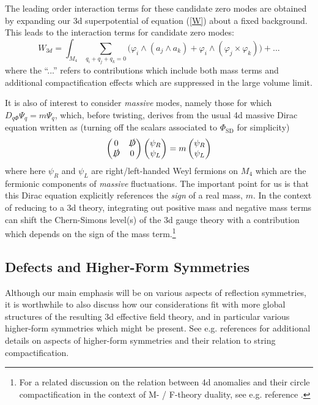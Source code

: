 \documentclass[12pt]{article}%
\numberwithin{equation}{section}
\renewcommand{\(}{\left(}
\renewcommand{\)}{\right)}
\renewcommand{\[}{\left[}
\renewcommand{\]}{\right]}
\begin{document}
The leading order interaction terms for these candidate zero modes are obtained by expanding our 3d superpotential
of equation (\ref{W}) about a fixed background. This leads to the interaction terms for candidate zero modes:
\begin{equation}
W_{3d}= \int_{M_4} \sum_{q_i+q_j+q_k=0}\big(\varphi_{i}\wedge (a_{j}\wedge a_{k})  + \varphi_{i}\wedge (\varphi_{j}\times \varphi_{k})\big) + ...
\end{equation}
where the ``...'' refers to contributions which include both mass terms and additional compactification effects which are suppressed
in the large volume limit.

It is also of interest to consider \textit{massive} modes, namely those for which $D_{q \Phi} \Psi_q = m \Psi_q$, which, before twisting, derives from the usual 4d massive Dirac equation written as (turning off the scalars associated to $\Phi_{\mathrm{SD}}$ for simplicity)
\begin{equation}
\begin{pmatrix}
0 & \slashed{D} \\
\slashed{D} & 0
\end{pmatrix}
\begin{pmatrix}
\psi_R \\
\psi_L
\end{pmatrix}=
m\begin{pmatrix}
\psi_R \\
\psi_L
\end{pmatrix}
\end{equation}
where here $\psi_R$ and $\psi_L$ are right/left-handed Weyl fermions
on $M_4$ which are the fermionic components of \textit{massive} fluctuations.
The important point for us is that this Dirac equation
explicitly references the \textit{sign} of a real mass, $m$.
In the context of reducing to a 3d theory, integrating out positive
mass and negative mass terms can shift the Chern-Simons level(s) of
the 3d gauge theory with a contribution which depends on
the sign of the mass term.\footnote{For a related discussion on
the relation between 4d anomalies and their circle compactification
in the context of M- / F-theory duality, see e.g. reference
\cite{Grimm:2011fx, Cvetic:2012xn, Corvilain:2017luj}.}

\subsection{Defects and Higher-Form Symmetries}

Although our main emphasis will be on various aspects of reflection symmetries,
it is worthwhile to also discuss how our considerations fit with more global structures
of the resulting 3d effective field theory, and in particular various
higher-form symmetries which might be present. See e.g. references \cite{Gaiotto:2014kfa,
DelZotto:2015isa, Eckhard:2019jgg, Morrison:2020ool, Albertini:2020mdx,
Closset:2020scj, DelZotto:2020esg, Bhardwaj:2020phs, Buican:2021xhs} for additional
details on aspects of higher-form symmetries
and their relation to string compactification.
\end{document}
